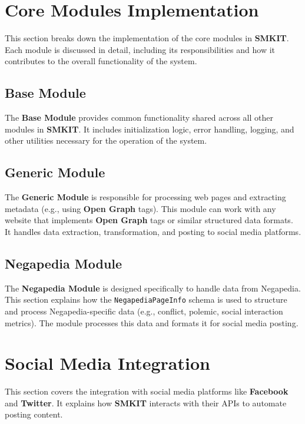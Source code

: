 \section{Core Modules Implementation}
\label{sec:core_modules_implementation}
This section breaks down the implementation of the core modules in \textbf{SMKIT}. Each module is discussed in detail, including its responsibilities and how it contributes to the overall functionality of the system.

\subsection{Base Module}
\label{subsec:base_module}
The \textbf{Base Module} provides common functionality shared across all other modules in \textbf{SMKIT}. It includes initialization logic, error handling, logging, and other utilities necessary for the operation of the system.

\subsection{Generic Module}
\label{subsec:generic_module}
The \textbf{Generic Module} is responsible for processing web pages and extracting metadata (e.g., using \textbf{Open Graph} tags). This module can work with any website that implements \textbf{Open Graph} tags or similar structured data formats. It handles data extraction, transformation, and posting to social media platforms.

\subsection{Negapedia Module}
\label{subsec:negapedia_module}
The \textbf{Negapedia Module} is designed specifically to handle data from Negapedia. This section explains how the \texttt{NegapediaPageInfo} schema is used to structure and process Negapedia-specific data (e.g., conflict, polemic, social interaction metrics). The module processes this data and formats it for social media posting.

\section{Social Media Integration}
\label{sec:social_media_integration}
This section covers the integration with social media platforms like \textbf{Facebook} and \textbf{Twitter}. It explains how \textbf{SMKIT} interacts with their APIs to automate posting content.

